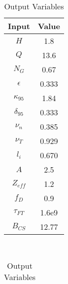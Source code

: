 \begin{table}[h!]
\centering  
\caption{Arc Variables}
\hfill
\begin{subtable}[t]{0.4\textwidth}
\centering  
\caption{Input Variables} ~\\
\begin{tabular}{ c|c } 

Input            & Value           \\
\hline
$H$              & 1.8             \\
$Q$              & 13.6            \\
$N_{G}$          & 0.67            \\
$\epsilon$       & 0.333          \\
$\kappa_{95}$    & 1.84            \\
$\delta_{95}$    & 0.333           \\
$\nu_{n}$        & 0.385           \\
$\nu_{T}$        & 0.929           \\
$l_{i}$          & 0.670            \\
$A$              & 2.5             \\
$Z_{eff}$        & 1.2             \\
$f_{D}$          & 0.9             \\
$\tau_{FT}$      & 1.6e9           \\
$B_{CS}$         & 12.77           \\

\end{tabular}
\end{subtable}
\hfill
\begin{subtable}[t]{0.5\textwidth}
\centering  
\caption{Output Variables} ~\\
\begin{tabular}{ c|c|c } 


\end{tabular}
\end{subtable}
\end{table}
